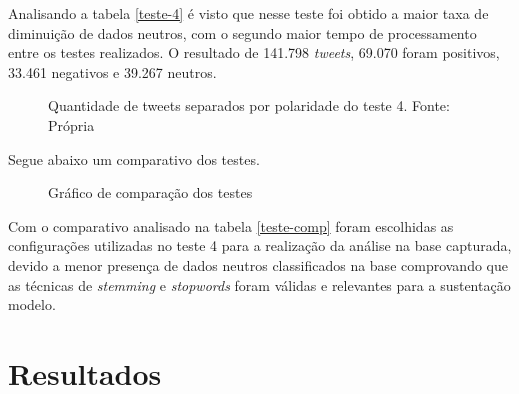 Analisando a tabela \ref{teste-4} é visto que nesse teste foi obtido a maior taxa de diminuição de dados neutros, com o segundo maior tempo de processamento entre os testes realizados. O resultado de 141.798 \textit{tweets}, 69.070 foram positivos, 33.461 negativos e 39.267 neutros.

\begin{figure}[!h]
	\centering{}
	\caption{Quantidade de tweets separados por polaridade do teste 4. Fonte: Própria}
	\label{teste-graf-4}
\end{figure}
Segue abaixo um comparativo dos testes.

\begin{table}[]		
	\caption{Comparando testes}
	\label{teste-comp}
\end{table}

\begin{figure}[!h]
	\centering{}
	\caption{Gráfico de comparação dos testes}
	\label{teste-graf-comp}
\end{figure}

Com o comparativo analisado na tabela \ref{teste-comp} foram escolhidas as configurações utilizadas no teste 4 para a realização da análise na base capturada, devido a menor presença de dados neutros classificados na base comprovando que as técnicas de \textit{stemming} e \textit{stopwords} foram válidas e relevantes para a sustentação modelo.

\section{Resultados}\label{result}


